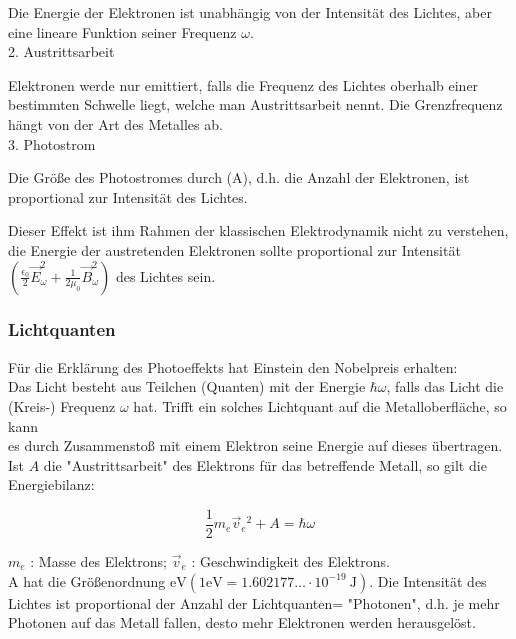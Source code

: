 \documentclass[10pt, letterpaper]{article}
\begin{document}
Die Energie der Elektronen ist unabhängig von der Intensität des Lichtes, aber eine lineare Funktion seiner Frequenz $\omega$.\\
2. Austrittsarbeit

Elektronen werde nur emittiert, falls die Frequenz des Lichtes oberhalb einer bestimmten Schwelle liegt, welche man Austrittsarbeit nennt. Die Grenzfrequenz hängt von der Art des Metalles ab.\\
3. Photostrom

Die Größe des Photostromes durch (A), d.h. die Anzahl der Elektronen, ist proportional zur Intensität des Lichtes.

Dieser Effekt ist ihm Rahmen der klassischen Elektrodynamik nicht zu verstehen, die Energie der austretenden Elektronen sollte proportional zur Intensität $\left(\frac{\epsilon_{0}}{2} \vec{E}_{\omega}^{2}+\frac{1}{2 \mu_{0}} \vec{B}_{\omega}^{2}\right)$ des Lichtes sein.

\subsubsection*{Lichtquanten}
Für die Erklärung des Photoeffekts hat Einstein den Nobelpreis erhalten:\\
Das Licht besteht aus Teilchen (Quanten) mit der Energie $\hbar \omega$, falls das Licht die (Kreis-) Frequenz $\omega$ hat. Trifft ein solches Lichtquant auf die Metalloberfläche, so kann\\
es durch Zusammenstoß mit einem Elektron seine Energie auf dieses übertragen. Ist $A$ die "Austrittsarbeit" des Elektrons für das betreffende Metall, so gilt die Energiebilanz:

$$
\frac{1}{2} m_{e} \vec{v}_{e}{ }^{2}+A=\hbar \omega
$$

$m_{e}$ : Masse des Elektrons; $\vec{v}_{e}$ : Geschwindigkeit des Elektrons.\\
A hat die Größenordnung $\mathrm{eV}\left(1 \mathrm{eV}=1.602177 \ldots \cdot 10^{-19} \mathrm{~J}\right)$. Die Intensität des Lichtes ist proportional der Anzahl der Lichtquanten= "Photonen", d.h. je mehr Photonen auf das Metall fallen, desto mehr Elektronen werden herausgelöst.
\end{document}
